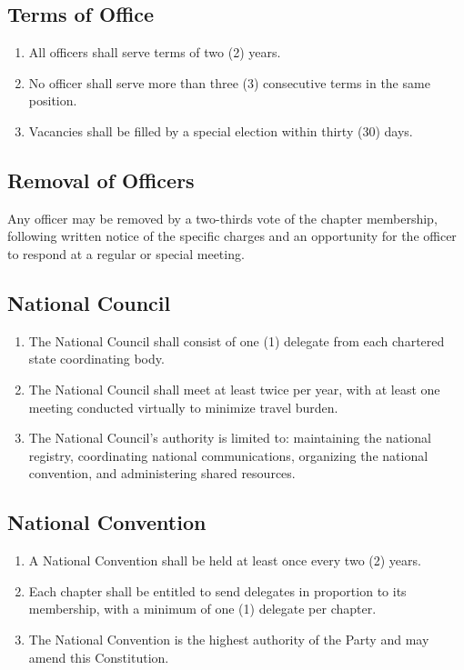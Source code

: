 \documentclass[11pt, letterpaper]{article}
\begin{document}
\subsection{Terms of Office}
\begin{enumerate}
  \item All officers shall serve terms of two (2) years.
  \item No officer shall serve more than three (3) consecutive terms in the same position.
  \item Vacancies shall be filled by a special election within thirty (30) days.
\end{enumerate}

\subsection{Removal of Officers}
Any officer may be removed by a two-thirds vote of the chapter membership, following written notice of the specific charges and an opportunity for the officer to respond at a regular or special meeting.




\subsection{National Council}
\begin{enumerate}
  \item The National Council shall consist of one (1) delegate from each chartered state coordinating body.
  \item The National Council shall meet at least twice per year, with at least one meeting conducted virtually to minimize travel burden.
  \item The National Council's authority is limited to: maintaining the national registry, coordinating national communications, organizing the national convention, and administering shared resources.
\end{enumerate}

\subsection{National Convention}
\begin{enumerate}
  \item A National Convention shall be held at least once every two (2) years.
  \item Each chapter shall be entitled to send delegates in proportion to its membership, with a minimum of one (1) delegate per chapter.
  \item The National Convention is the highest authority of the Party and may amend this Constitution.
\end{enumerate}
\end{document}
